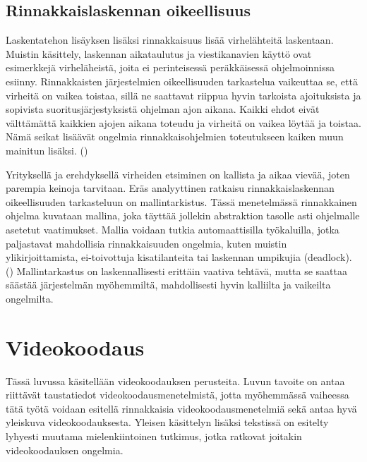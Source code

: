 \subsection{Rinnakkaislaskennan oikeellisuus}

Laskentatehon lisäyksen lisäksi rinnakkaisuus lisää virhelähteitä laskentaan.
Muistin käsittely, laskennan aikataulutus ja viestikanavien käyttö ovat
esimerkkejä virheläheistä, joita ei perinteisessä peräkkäisessä ohjelmoinnissa
esiinny. Rinnakkaisten järjestelmien oikeellisuuden tarkastelua vaikeuttaa se,
että virheitä on vaikea toistaa, sillä ne saattavat riippua hyvin tarkoista
ajoituksista ja sopivista suoritusjärjestyksistä ohjelman ajon aikana. Kaikki
ehdot eivät välttämättä kaikkien ajojen aikana toteudu ja virheitä on vaikea
löytää ja toistaa. Nämä seikat lisäävät ongelmia rinnakkaisohjelmien
toteutukseen kaiken muun mainitun lisäksi. (\citealt{ari})

Yrityksellä ja erehdyksellä virheiden etsiminen on kallista ja aikaa vievää,
joten parempia keinoja tarvitaan. Eräs analyyttinen ratkaisu
rinnakkaislaskennan oikeellisuuden tarkasteluun on mallintarkistus. Tässä
menetelmässä rinnakkainen ohjelma kuvataan mallina, joka täyttää jollekin
abstraktion tasolle asti ohjelmalle asetetut vaatimukset. Mallia voidaan
tutkia automaattisilla työkaluilla, jotka paljastavat mahdollisia
rinnakkaisuuden ongelmia, kuten muistin ylikirjoittamista, ei-toivottuja
kisatilanteita tai laskennan umpikujia (deadlock). (\citealt{ari})
Mallintarkastus on laskennallisesti erittäin vaativa tehtävä, mutta se saattaa
säästää järjestelmän myöhemmiltä, mahdollisesti hyvin kalliilta ja vaikeilta
ongelmilta.

\section{Videokoodaus}

Tässä luvussa käsitellään videokoodauksen perusteita. Luvun tavoite on
antaa riittävät taustatiedot videokoodausmenetelmistä, jotta myöhemmässä
vaiheessa tätä työtä voidaan esitellä rinnakkaisia
videokoodausmenetelmiä sekä antaa hyvä yleiskuva videokoodauksesta. Yleisen
käsittelyn lisäksi tekstissä on esitelty lyhyesti muutama mielenkiintoinen
tutkimus, jotka ratkovat joitakin videokoodauksen ongelmia.

